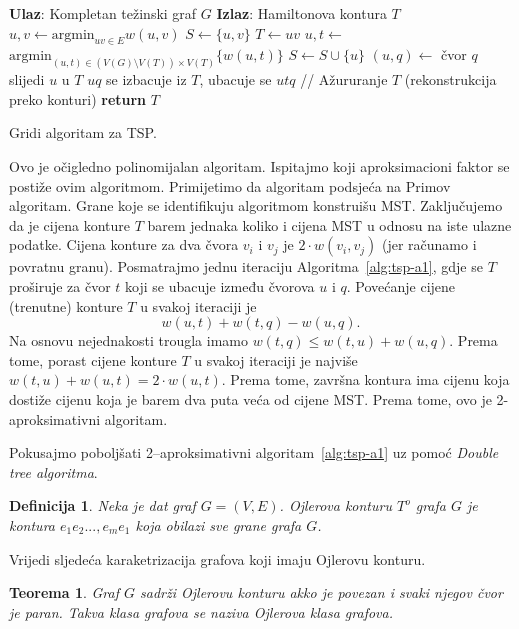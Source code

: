 \documentclass[a4paper, utf8, 11pt, colorlinks]{article}
\newtheorem{definition}{Definicija}
\newtheorem{thm}{Teorema}
\begin{document}
   \begin{algorithm}[!t] 
  
  	\begin{algorithmic}[1]
  		\STATE \textbf{Ulaz}: Kompletan težinski graf $G$
  		\STATE \textbf{Izlaz}: Hamiltonova kontura $T$  
  		\STATE $u,v \gets \mbox{argmin}_{uv \in E} w(u,v)$
  		\STATE $S \gets \{u,v\}$
  		\STATE $T \gets uv$
  		\STATE $u,t \gets$ $\mbox{argmin}_{(u,t) \in (V(G)\setminus V(T)) \times V(T)} \{w(u, t)\}$
  		\STATE $ S \gets S \cup \{u\}$ 
  		\STATE $(u, q)\gets$ čvor $q$ slijedi $u$ u  $T$
  		\STATE  $uq$ se izbacuje iz $T$, ubacuje se $utq$  // Ažururanje $T$ (rekonstrukcija preko konturi)
  		\ENDWHILE
  		\STATE \textbf{return} $T$
  	\end{algorithmic}
   	\caption{Gridi algoritam za TSP.}
   	\label{alg:tsp-a1}
  \end{algorithm}

 Ovo je očigledno polinomijalan algoritam. Ispitajmo koji aproksimacioni faktor se 
postiže ovim algoritmom. Primijetimo da algoritam podsjeća na Primov algoritam. Grane koje se identifikuju algoritmom 
konstruišu MST. Zaključujemo da je cijena konture $T$ barem jednaka koliko i cijena MST u odnosu na iste ulazne podatke. Cijena konture za dva čvora $v_i$ i $v_j$ je $2 \cdot w({v_i,v_j})$ (jer računamo i povratnu granu). Posmatrajmo jednu iteraciju Algoritma~\ref{alg:tsp-a1}, gdje se $T$
proširuje za čvor $t$ koji se ubacuje između čvorova  $u$ i $q$. Povećanje cijene (trenutne) konture $T$ u svakoj iteraciji je $$w({u,t}) + w({t,q})-w({u,q}).$$
Na osnovu nejednakosti trougla imamo $ w({t,q}) \leq w({t,u}) + w({u,q})$. Prema tome, porast cijene konture $T$ u svakoj iteraciji je najviše $ w({t, u}) + w({u,t}) = 2\cdot w({u,t})$. 
Prema tome, završna kontura ima cijenu koja dostiže cijenu koja je barem dva puta veća od cijene MST. Prema tome, ovo je 2-aproksimativni algoritam. 

 \noindent Pokusajmo poboljšati 2--aproksimativni algoritam~\ref{alg:tsp-a1} uz pomoć \emph{Double tree algoritma}. 
 \begin{definition}
 	  Neka je dat graf $G=(V,E)$. Ojlerova konturu $T^o$ grafa $G$ je kontura $e_1e_2...,e_me_1$ koja obilazi sve grane grafa $G$. 
 \end{definition}
Vrijedi sljedeća karaketrizacija grafova koji imaju Ojlerovu konturu. 
\begin{thm}
	 Graf $G$ sadrži Ojlerovu konturu akko je povezan i svaki njegov čvor je paran. Takva klasa grafova se naziva Ojlerova klasa grafova.
\end{thm}
\end{document}
